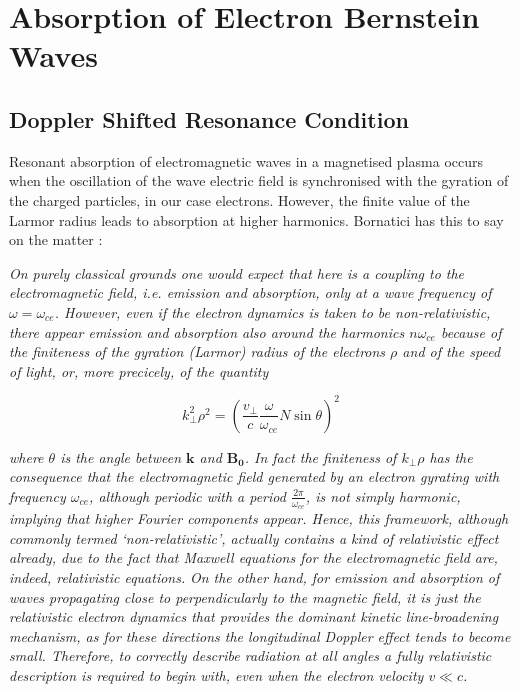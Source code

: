 \section{Absorption of Electron Bernstein Waves}
\subsection{Doppler Shifted Resonance Condition}
Resonant absorption of electromagnetic waves in a magnetised plasma occurs when the oscillation of the wave electric field is synchronised with the gyration of the charged particles, in our case electrons. However, the finite value of the Larmor radius leads to absorption at higher harmonics. Bornatici has this to say on the matter \cite{bornatici1983}:

\textit{
	On purely classical grounds one would expect that here is a coupling to the electromagnetic field, i.e. emission and absorption, only at a wave frequency of $\omega=\omega_{ce}$. However, even if the electron dynamics is taken to be non-relativistic, there appear emission and absorption also around the harmonics $n\omega_{ce}$ because of the finiteness of the gyration (Larmor) radius of the electrons $\rho$ and of the speed of light, or, more precicely, of the quantity
}
	
\begin{equation}
k_{\perp}^2\rho^2=\left( \frac{v_{\perp}}{c} \frac{\omega}{\omega_{ce}} N \sin \theta \right)^2
\end{equation}

\textit{
	where $\theta$ is the angle between $\bm{k}$ and $\bm{B_0}$. In fact the finiteness of $k_{\perp}\rho$ has the consequence that the electromagnetic field generated by an electron gyrating with frequency $\omega_{ce}$, although periodic with a period $\frac{2\pi}{\omega_{ce}}$, is not simply harmonic, implying that higher Fourier components appear. Hence, this framework, although commonly termed `non-relativistic', actually contains a kind of relativistic effect already, due to the fact that Maxwell equations for the electromagnetic field are, indeed, relativistic equations.}
\textit{
	On the other hand, for emission and absorption of waves propagating close to perpendicularly to the magnetic field, it is just the relativistic electron dynamics that provides the dominant kinetic line-broadening mechanism, as for these directions the longitudinal Doppler effect tends to become small. Therefore, to correctly describe radiation at all angles a fully relativistic description is required to begin with, even when the electron velocity $v \ll c$.
}

